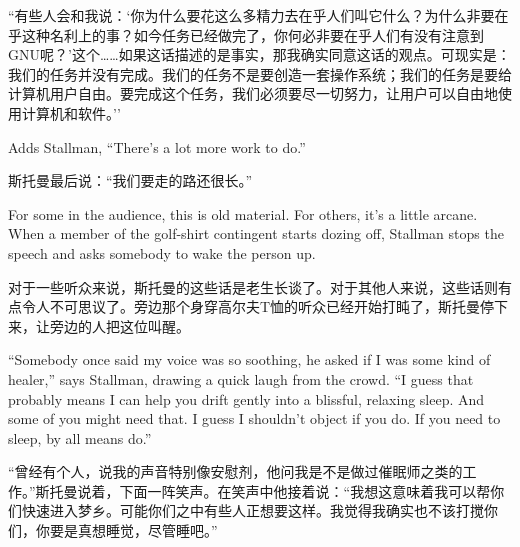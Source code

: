 \ifdefined\chs
``有些人会和我说：`你为什么要花这么多精力去在乎人们叫它什么？为什么非要在乎这种名利上的事？如今任务已经做完了，你何必非要在乎人们有没有注意到GNU呢？'这个……如果这话描述的是事实，那我确实同意这话的观点。可现实是：我们的任务并没有完成。我们的任务不是要创造一套操作系统；我们的任务是要给计算机用户自由。要完成这个任务，我们必须要尽一切努力，让用户可以自由地使用计算机和软件。''
\fi

\ifdefined\eng
Adds Stallman, ``There's a lot more work to do.''
\fi

\ifdefined\chs
斯托曼最后说：``我们要走的路还很长。''
\fi

\ifdefined\eng
For some in the audience, this is old material. For others, it's a little arcane. When a member of the golf-shirt contingent starts dozing off, Stallman stops the speech and asks somebody to wake the person up.
\fi

\ifdefined\chs
对于一些听众来说，斯托曼的这些话是老生长谈了。对于其他人来说，这些话则有点令人不可思议了。旁边那个身穿高尔夫T恤的听众已经开始打盹了，斯托曼停下来，让旁边的人把这位叫醒。
\fi

\ifdefined\eng
``Somebody once said my voice was so soothing, he asked if I was some kind of healer,'' says Stallman, drawing a quick laugh from the crowd. ``I guess that probably means I can help you drift gently into a blissful, relaxing sleep. And some of you might need that. I guess I shouldn't object if you do. If you need to sleep, by all means do.''
\fi

\ifdefined\chs
``曾经有个人，说我的声音特别像安慰剂，他问我是不是做过催眠师之类的工作。''斯托曼说着，下面一阵笑声。在笑声中他接着说：``我想这意味着我可以帮你们快速进入梦乡。可能你们之中有些人正想要这样。我觉得我确实也不该打搅你们，你要是真想睡觉，尽管睡吧。''
\fi


